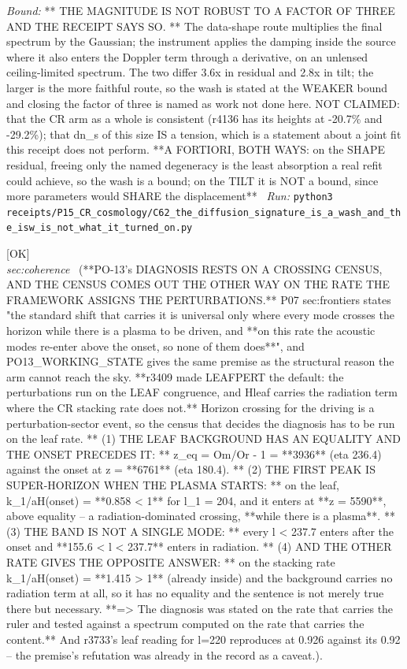 \begin{description}
 \emph{Bound:} ** THE MAGNITUDE IS NOT ROBUST TO A FACTOR OF THREE AND THE RECEIPT SAYS SO. ** The data-shape route multiplies the final spectrum by the Gaussian; the instrument applies the damping inside the source where it also enters the Doppler term through a derivative, on an unlensed ceiling-limited spectrum. The two differ 3.6x in residual and 2.8x in tilt; the larger is the more faithful route, so the wash is stated at the WEAKER bound and closing the factor of three is named as work not done here. NOT CLAIMED: that the CR arm as a whole is consistent (r4136 has its heights at -20.7\% and -29.2\%); that dn\_s of this size IS a tension, which is a statement about a joint fit this receipt does not perform. **A FORTIORI, BOTH WAYS: on the SHAPE residual, freeing only the named degeneracy is the least absorption a real refit could achieve, so the wash is a bound; on the TILT it is NOT a bound, since more parameters would SHARE the displacement**
\ \emph{Run:} \texttt{python3 receipts/P15\_CR\_cosmology/C62\_the\_diffusion\_signature\_is\_a\_wash\_and\_the\_isw\_is\_not\_what\_it\_turned\_on.py}
\item[\label{rcpt:C61_the_undriven_premise_is_false_on_the_rate_the_framework_assigns_the_perturbations}\texttt{C61\_the\_undriven\_premise\_is\_false\_on\_the\_rate\_the\_framework\_assigns\_the\_perturbations}]\hfill\textsf{[OK]}\\
\textit{sec:coherence} \ (**PO-13's DIAGNOSIS RESTS ON A CROSSING CENSUS, AND THE CENSUS COMES OUT THE OTHER WAY ON THE RATE THE FRAMEWORK ASSIGNS THE PERTURBATIONS.** P07 sec:frontiers states "the standard shift that carries it is universal only where every mode crosses the horizon while there is a plasma to be driven, and **on this rate the acoustic modes re-enter above the onset, so none of them does**", and PO13\_WORKING\_STATE gives the same premise as the structural reason the arm cannot reach the sky. **r3409 made LEAFPERT the default: the perturbations run on the LEAF congruence, and Hleaf carries the radiation term where the CR stacking rate does not.** Horizon crossing for the driving is a perturbation-sector event, so the census that decides the diagnosis has to be run on the leaf rate. ** (1) THE LEAF BACKGROUND HAS AN EQUALITY AND THE ONSET PRECEDES IT: ** z\_eq = Om/Or - 1 = **3936** (eta 236.4) against the onset at z = **6761** (eta 180.4). ** (2) THE FIRST PEAK IS SUPER-HORIZON WHEN THE PLASMA STARTS: ** on the leaf, k\_1/aH(onset) = **0.858 < 1** for l\_1 = 204, and it enters at **z = 5590**, above equality -- a radiation-dominated crossing, **while there is a plasma**. ** (3) THE BAND IS NOT A SINGLE MODE: ** every l < 237.7 enters after the onset and **155.6 < l < 237.7** enters in radiation. ** (4) AND THE OTHER RATE GIVES THE OPPOSITE ANSWER: ** on the stacking rate k\_1/aH(onset) = **1.415 > 1** (already inside) and the background carries no radiation term at all, so it has no equality and the sentence is not merely true there but necessary. **=> The diagnosis was stated on the rate that carries the ruler and tested against a spectrum computed on the rate that carries the content.**  And r3733's leaf reading for l=220 reproduces at 0.926 against its 0.92 -- the premise's refutation was already in the record as a caveat.). 

\end{description}
